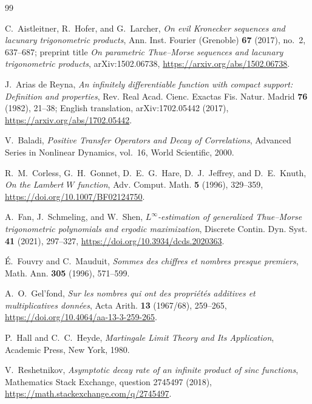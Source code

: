 \documentclass[11pt,oneside]{article}
\theoremstyle{definition}
\theoremstyle{remark}
\begin{document}
\begin{thebibliography}{99}

C.~Aistleitner, R.~Hofer, and G.~Larcher,
\newblock \emph{On evil Kronecker sequences and lacunary trigonometric products},
\newblock Ann. Inst. Fourier (Grenoble) \textbf{67} (2017), no.~2, 637--687;
preprint title \emph{On parametric Thue--Morse sequences and lacunary
trigonometric products}, arXiv:1502.06738,
\newblock \url{https://arxiv.org/abs/1502.06738}.

J.~Arias de Reyna,
\newblock \emph{An infinitely differentiable function with compact support:
Definition and properties},
\newblock Rev. Real Acad. Cienc. Exactas Fis. Natur. Madrid \textbf{76} (1982),
21--38; English translation, arXiv:1702.05442 (2017),
\newblock \url{https://arxiv.org/abs/1702.05442}.

V.~Baladi,
\newblock \emph{Positive Transfer Operators and Decay of Correlations},
\newblock Advanced Series in Nonlinear Dynamics, vol.~16, World Scientific,
2000.

R.~M.~Corless, G.~H.~Gonnet, D.~E.~G.~Hare, D.~J.~Jeffrey, and D.~E.~Knuth,
\newblock \emph{On the Lambert $W$ function},
\newblock Adv. Comput. Math. \textbf{5} (1996), 329--359,
\newblock \url{https://doi.org/10.1007/BF02124750}.

A.~Fan, J.~Schmeling, and W.~Shen,
\newblock \emph{$L^\infty$-estimation of generalized Thue--Morse trigonometric
polynomials and ergodic maximization},
\newblock Discrete Contin. Dyn. Syst. \textbf{41} (2021), 297--327,
\newblock \url{https://doi.org/10.3934/dcds.2020363}.

\'E.~Fouvry and C.~Mauduit,
\newblock \emph{Sommes des chiffres et nombres presque premiers},
\newblock Math. Ann. \textbf{305} (1996), 571--599.

A.~O.~Gel'fond,
\newblock \emph{Sur les nombres qui ont des propri\'et\'es additives et
multiplicatives donn\'ees},
\newblock Acta Arith. \textbf{13} (1967/68), 259--265,
\newblock \url{https://doi.org/10.4064/aa-13-3-259-265}.

P.~Hall and C.~C.~Heyde,
\newblock \emph{Martingale Limit Theory and Its Application},
\newblock Academic Press, New York, 1980.

V.~Reshetnikov,
\newblock \emph{Asymptotic decay rate of an infinite product of sinc functions},
\newblock Mathematics Stack Exchange, question 2745497 (2018),
\newblock \url{https://math.stackexchange.com/q/2745497}.


\end{thebibliography}
\end{document}
